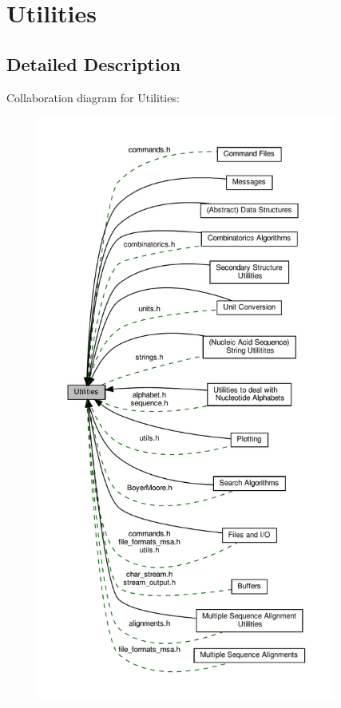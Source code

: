 \hypertarget{group__utils}{}\section{Utilities}
\label{group__utils}


\subsection{Detailed Description}
Collaboration diagram for Utilities\+:
\nopagebreak
\begin{figure}[H]
\begin{center}
\leavevmode
\includegraphics[height=550pt]{group__utils}
\end{center}
\end{figure}
